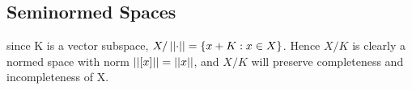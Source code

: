 \subsection{Seminormed Spaces}



 










since K is a vector subspace, $X/\left|\left| \cdot \right|\right|=\{x+K: x \in X\}$.
Hence $X/K$ is clearly a normed space with norm $\left|\left| [x] \right|\right| = \left|\left| x \right|\right|$, and $X/K$ will preserve completeness and incompleteness of X. 

